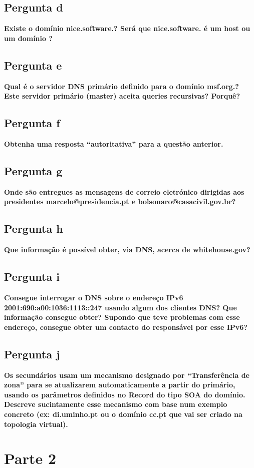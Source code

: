 \documentclass[a4paper]{report}
\begin{document}
\section{Pergunta d}
\textbf{Existe o domínio nice.software.? Será que nice.software. é um host ou um
domínio ?}

\section{Pergunta e}
\textbf{Qual é o servidor DNS primário definido para o domínio msf.org.? Este
servidor primário (master) aceita queries recursivas? Porquê?}

\section{Pergunta f}
\textbf{Obtenha uma resposta “autoritativa” para a questão anterior.}

\section{Pergunta g}
\textbf{Onde são entregues as mensagens de correio eletrónico dirigidas aos
presidentes marcelo@presidencia.pt e bolsonaro@casacivil.gov.br?}

\section{Pergunta h}
\textbf{Que informação é possível obter, via DNS, acerca de whitehouse.gov?}

\section{Pergunta i}
\textbf{Consegue interrogar o DNS sobre o endereço IPv6
2001:690:a00:1036:1113::247 usando algum dos clientes DNS? Que informação
consegue obter? Supondo que teve problemas com esse endereço, consegue obter um
contacto do responsável por esse IPv6?}

\section{Pergunta j}
\textbf{Os secundários usam um mecanismo designado por “Transferência de zona”
para se atualizarem automaticamente a partir do primário, usando os parâmetros
definidos no Record do tipo SOA do domínio. Descreve sucintamente esse mecanismo
com base num exemplo concreto (ex: di.uminho.pt ou o domínio cc.pt que vai ser
criado na topologia virtual).}

\chapter{Parte 2}
\end{document}

